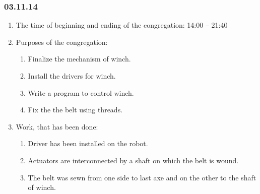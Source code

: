 	
\subsubsection{03.11.14}

\begin{enumerate}
	\item The time of beginning and ending of the congregation:
	14:00 – 21:40
	\item Purposes of the congregation:
	\begin{enumerate}
	  \item	Finalize the mechanism of winch.
	  
	  \item Install the drivers for winch.
	  
	  \item	Write a program to control  winch.
	  
	  \item	Fix the the belt using threads.
	  
    \end{enumerate}
    
	\item Work, that has been done:
	\begin{enumerate}
	  \item	Driver has been installed on the robot.
      
      \item	Actuators are interconnected by a shaft on which the belt is wound.
      
      \item	The belt was sewn from one side to last axe and on the other to the shaft of winch.
      

\end{enumerate}
\end{enumerate}
